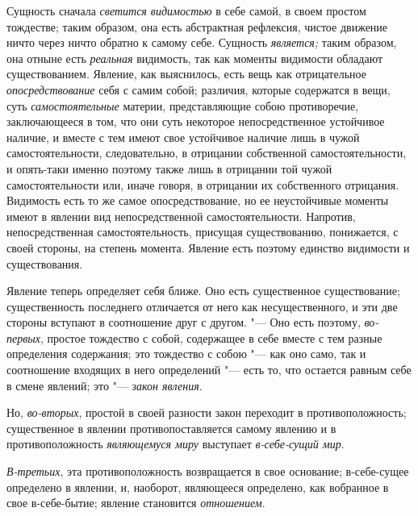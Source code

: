 Сущность сначала {\em светится видимостью} в себе самой,
в своем простом тождестве; таким образом, она есть абстрактная рефлексия,
чистое движение ничто через ничто обратно к самому себе. Сущность
{\em является;} таким образом, она отныне есть
{\em реальная} видимость, так как моменты видимости
обладают существованием. Явление, как выяснилось, есть вещь как
отрицательное {\em опосредствование} себя с самим
собой; различия, которые содержатся в вещи, суть
{\em самостоятельные} материи, представляющие собою
противоречие, заключающееся в том, что они суть некоторое непосредственное
устойчивое наличие, и вместе с тем имеют свое устойчивое наличие лишь в
чужой самостоятельности, следовательно, в отрицании собственной
самостоятельности, и опять-таки именно поэтому также лишь в отрицании той
чужой самостоятельности или, иначе говоря, в отрицании их собственного
отрицания. Видимость есть то же самое опосредствование, но ее неустойчивые
моменты имеют в явлении вид непосредственной самостоятельности. Напротив,
непосредственная самостоятельность, присущая существованию, понижается, с
своей стороны, на степень момента. Явление есть поэтому единство видимости
и существования.

Явление теперь определяет себя ближе. Оно есть существенное существование;
существенность последнего отличается от него как несущественного, и эти две
стороны вступают в соотношение друг с другом. "--- Оно есть поэтому,
{\em во-первых}, простое тождество с собой, содержащее
в себе вместе с тем разные определения содержания; это тождество с собою
"--- как оно само, так и соотношение входящих в него определений "--- есть то,
что остается равным себе в смене явлений; это
"--- {\em закон явления}.

Но, {\em во-вторых}, простой в своей разности закон
переходит в противоположность; существенное в явлении противопоставляется
самому явлению и в противоположность {\em являющемуся
миру} выступает {\em в-себе-сущий мир}.

{\em В-третьих}, эта противоположность возвращается в
свое основание; в-себе-сущее определено в явлении, и, наоборот, являющееся
определено, как вобранное в свое в-себе-бытие; явление становится
{\em отношением}.

